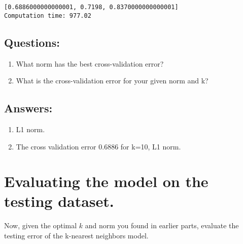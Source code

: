 \documentclass[11pt]{article}
\begin{document}
    \begin{Verbatim}[commandchars=\\\{\}]
[0.6886000000000001, 0.7198, 0.8370000000000001]
Computation time: 977.02

    \end{Verbatim}

    \subsection{Questions:}\label{questions}

\begin{enumerate}
\def\labelenumi{(\arabic{enumi})}
\item
  What norm has the best cross-validation error?
\item
  What is the cross-validation error for your given norm and k?
\end{enumerate}

    \subsection{Answers:}\label{answers}

\begin{enumerate}
\def\labelenumi{(\arabic{enumi})}
\item
  L1 norm.
\item
  The cross validation error 0.6886 for k=10, L1 norm.
\end{enumerate}

    \section{Evaluating the model on the testing
dataset.}\label{evaluating-the-model-on-the-testing-dataset.}

Now, given the optimal \(k\) and norm you found in earlier parts,
evaluate the testing error of the k-nearest neighbors model.
\end{document}
